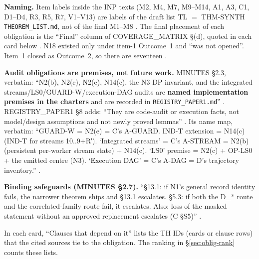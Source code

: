 \textbf{Naming.} Item labels inside the INP texts (M2, M4, M7, M9--M14, A1, A3, C1, D1--D4, R3, R5, R7, V1--V13) are labels of the draft list TL $=$ THM-SYNTH \texttt{THEOREM\_LIST.md}, not of the final M1--M8 . The final placement of each obligation is the ``Final'' column of COVERAGE\_MATRIX §(d), quoted in each card below . N18 existed only under item-1 Outcome~1 and ``was not opened''. Item~1 closed as Outcome~2, so there are seventeen .

\textbf{Audit obligations are premises, not future work.} MINUTES §2.3, verbatim: ``N2(b), N2(c), N2(e), N14(c), the N3 DP invariant, and the integrated streams/LS0/GUARD-W/execution-DAG audits are \textbf{named implementation premises in the charters} and are recorded in \texttt{REGISTRY\_PAPER1.md}'' . REGISTRY\_PAPER1 §8 adds: ``They are code-audit or execution facts, not model/design assumptions and not newly proved lemmas'' . Its name map, verbatim: ``GUARD-W = N2(e) = C's A-GUARD. IND-T extension = N14(c) (IND-T for streams 10..9+R′). `Integrated streams' = C's A-STREAM = N2(b) (persistent per-worker stream state) + N14(c). `LS0' premise = N2(c) + OP-LS0 + the emitted centre (N3). `Execution DAG' = C's A-DAG = D's trajectory inventory.'' .

\textbf{Binding safeguards (MINUTES §2.7).} ``§13.1: if N1's general record identity fails, the narrower theorem ships and §13.1 escalates. §5.3: if both the D\_* route and the correlated-family route fail, it escalates. Also: loss of the masked statement without an approved replacement escalates (C §S5)'' .

In each card, ``Clauses that depend on it'' lists the TH IDs (cards or clause rows) that the cited sources tie to the obligation. The ranking in §\ref{sec:oblig-rank} counts these lists.

